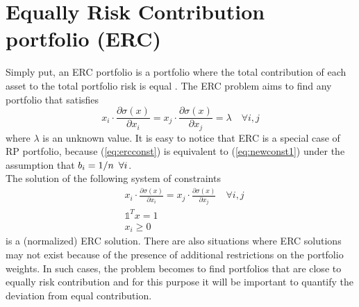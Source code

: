 \section{Equally Risk Contribution portfolio (ERC)}
Simply put, an ERC portfolio is a portfolio where the total contribution of each asset to the total portfolio risk is equal \cite{tutuncu}. The ERC problem aims to find any portfolio that satisfies
\begin{equation}\label{eq:ercconst}
x_i\cdot\frac{\partial\sigma (x)}{\partial x_i} = x_j\cdot\frac{\partial\sigma (x)}{\partial x_j} = \lambda \quad \forall i,j
\end{equation}
where $\lambda$ is an unknown value. It is easy to notice that ERC is a special case of RP portfolio, because (\ref{eq:ercconst}) is equivalent to (\ref{eq:newconst1}) under the assumption that $b_i = 1/n \hspace{0.5em} \forall i$.\\
The solution of the following system of constraints
\begin{equation}\label{eq:b}
\begin{aligned}
&x_i\cdot\frac{\partial\sigma (x)}{\partial x_i} = x_j\cdot\frac{\partial\sigma (x)}{\partial x_j} \quad \forall i,j\\
&\mathds{1}^T x =1\\
&x_i \geq 0
\end{aligned}
\end{equation}
is a (normalized) ERC solution. There are also situations where ERC solutions may not exist because of the presence of additional restrictions on the portfolio weights. In such cases, the problem becomes to find portfolios that are close to equally risk contribution and for this purpose it will be important to quantify the deviation from equal contribution.

